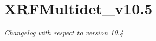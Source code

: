 \documentclass[a4paper,12pt]{article}
\begin{document}
\section{XRFMultidet\_v10.5}
\textit{Changelog with respect to version 10.4}

\end{document}
